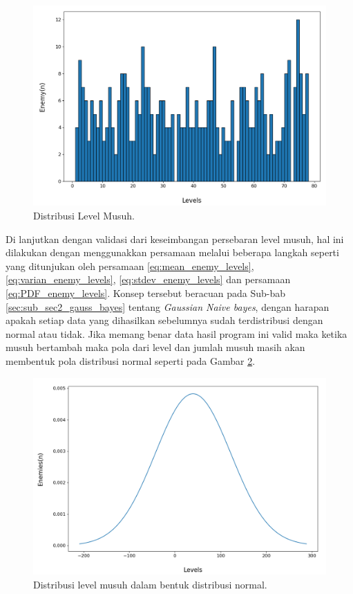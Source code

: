 \begin{figure} [!h] \centering
	\includegraphics[scale=0.45]{img/EnemyLevelDistrib.png}
	\caption{Distribusi Level Musuh.}
	\label{fig:enemy_level_distrib}
\end{figure}

Di lanjutkan dengan validasi dari keseimbangan persebaran level musuh, hal ini dilakukan dengan menggunakkan persamaan melalui beberapa langkah seperti yang ditunjukan oleh persamaan \ref{eq:mean_enemy_levels}, \ref{eq:varian_enemy_levels}, \ref{eq:stdev_enemy_levels} dan persamaan \ref{eq:PDF_enemy_levels}. Konsep tersebut beracuan pada Sub-bab \ref{sec:sub_sec2_gauss_bayes} tentang \textit{Gaussian Naive bayes}, dengan harapan apakah setiap data yang dihasilkan sebelumnya sudah terdistribusi dengan normal atau tidak. Jika memang benar data hasil program ini valid maka ketika musuh bertambah maka pola dari level dan jumlah musuh masih akan membentuk pola distribusi normal seperti pada Gambar \ref{fig:enemy_level_distrib_ndist}.
\vspace{1ex}

\begin{figure} [!h] \centering
	\includegraphics[scale=0.5]{img/EnemyLevelDistribNdist.png}
	\caption{Distribusi level musuh dalam bentuk distribusi normal.}
	\label{fig:enemy_level_distrib_ndist}
\end{figure}

